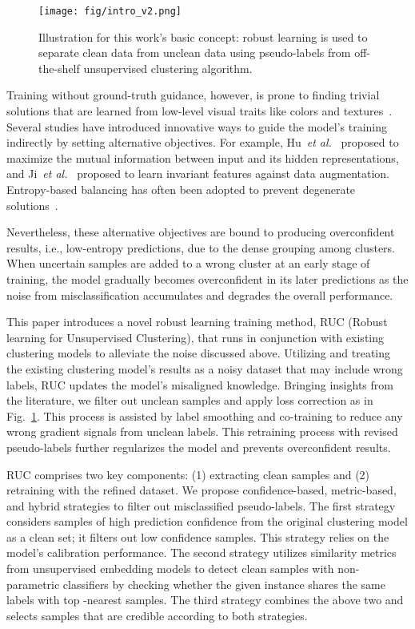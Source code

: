 \documentclass[final]{cvpr}
\newcommand{\model}{\textsf{RUC}}
\begin{document}
\begin{figure}[t!]
    \centerline{
    \texttt{[image: fig/intro\_v2.png]}}
    \caption{Illustration for this work's basic concept: robust learning is used to separate clean data from unclean data using pseudo-labels from off-the-shelf unsupervised clustering algorithm.}
    \label{fig:intro}
\end{figure}

Training without ground-truth guidance, however, is prone to finding trivial solutions that are learned from low-level visual traits like colors and textures~\cite{ji2019invariant}. Several studies have introduced innovative ways to guide the model's training indirectly by setting alternative objectives. For example, Hu~\emph{et al.}~\cite{hu2017learning} proposed to maximize the mutual information between input and its hidden representations, and Ji~\emph{et al.}~\cite{ji2019invariant} proposed to learn invariant features against data augmentation. Entropy-based balancing has often been adopted to prevent degenerate solutions~\cite{hanmitigating,ji2019invariant, van2020scan}.

Nevertheless, these alternative objectives are bound to producing overconfident results, i.e., low-entropy predictions, due to the dense grouping among clusters. When uncertain samples are added to a wrong cluster at an early stage of training, the model gradually becomes overconfident in its later predictions as the noise from misclassification accumulates and degrades the overall performance.

This paper introduces a novel robust learning training method, \model{} (\textsf{R}obust learning for \textsf{U}nsupervised \textsf{C}lustering), that runs in conjunction with existing clustering models to alleviate the noise discussed above. Utilizing and treating the existing clustering model's results as a noisy dataset that may include wrong labels, \model{} updates the model's misaligned knowledge. Bringing insights from the literature, we filter out unclean samples and apply loss correction as in Fig.~\ref{fig:intro}. This process is assisted by label smoothing and co-training to reduce any wrong gradient signals from unclean labels. This retraining process with revised pseudo-labels further regularizes the model and prevents overconfident results.


\model{} comprises two key components: (1) extracting clean samples and (2) retraining with the refined dataset. We propose confidence-based, metric-based, and hybrid strategies to filter out misclassified pseudo-labels. The first strategy considers samples of high prediction confidence from the original clustering model as a clean set; it filters out low confidence samples. This strategy relies on the model's calibration performance. The second strategy utilizes similarity metrics from unsupervised embedding models to detect clean samples with non-parametric classifiers by checking whether the given instance shares the same labels with top -nearest samples. The third strategy combines the above two and selects samples that are credible according to both strategies.
\end{document}
